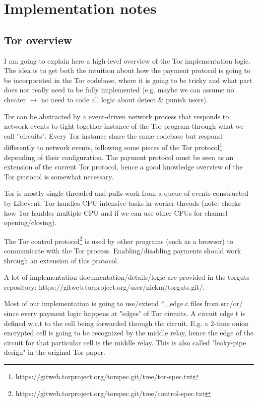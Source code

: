 \documentclass{article}
\begin{document}
\section{Implementation notes}

\subsection{Tor overview}

I am going to explain here a high-level overview of the Tor implementation logic. The idea is to get both the intuition about how the payment protocol is going to be incorporated in the Tor codebase, where it is going to be tricky and what part does not really need to be fully implemented (e.g. maybe we can assume no cheater $\rightarrow$ no need to code all logic about detect \& punish users).

Tor can be abstracted by a event-driven network process that responds to network events to tight together instance of the Tor program through what we call ''circuits". Every Tor instance share the same codebase but respond differently to network events,  following some pieces of the Tor protocol\footnote{https://gitweb.torproject.org/torspec.git/tree/tor-spec.txt} depending of their configuration. The payment protocol must be seen as an extension of the current Tor protocol, hence a good knowledge overview of the Tor protocol is somewhat necessary.

Tor is mostly single-threaded and pulls work from a queue of events constructed by Libevent. Tor handles CPU-intensive tasks in worker threads (note: checks how Tor hanldes multiple CPU and if we can use other CPUs for channel opening/closing).

The Tor control protocol\footnote{https://gitweb.torproject.org/torspec.git/tree/control-spec.txt} is used by other programs (such as a browser) to communicate with the Tor process. Enabling/disabling payments should work through an extension of this protocol.

A lot of implementation documentation/details/logic are provided in the torguts repository: https://gitweb.torproject.org/user/nickm/torguts.git/. 

Most of our implementation is going to use/extend *\_edge.c files from src/or/ since every payment logic happens at "edges" of Tor circuits. A circuit edge t is defined w.r.t to the cell being forwarded through the circuit. E.g. a 2-time onion encrypted cell is going to be recognized by the middle relay, hence the edge of the circuit for that particular cell is the middle relay. This is also called "leaky-pipe design" in the original Tor paper.
\end{document}
